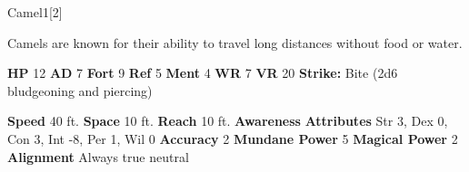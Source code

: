   \begin{monsection}{Camel}{1}[2]
    \vspace{-1em}\vspace{-1em}
    \vspace{0em}

    
        Camels are known for their ability to travel long distances without food or water.
      

    \begin{spellcontent}
      \begin{spelltargetinginfo}
        \pari \textbf{HP} 12 \monsep
          \textbf{AD} 7 \monsep
          \textbf{Fort} 9 \monsep
          \textbf{Ref} 5 \monsep
          \textbf{Ment} 4
        \pari \textbf{WR} 7 \monsep
        \textbf{VR} 20
        \pari \textbf{Strike:}
            Bite  (2d6 bludgeoning and piercing)
      \end{spelltargetinginfo}
    \end{spellcontent}
    \begin{monsterfooter}
      \pari \textbf{Speed} 40 ft. \monsep
        \textbf{Space} 10 ft. \monsep
        \textbf{Reach} 10 ft.
      \pari \textbf{Awareness} 
      \pari \textbf{Attributes}
        Str 3, Dex 0,
        Con 3, Int -8,
        Per 1, Wil 0
      \pari \textbf{Accuracy} 2 \monsep
        \textbf{Mundane Power} 5 \monsep
      \textbf{Magical Power} 2
      \pari \textbf{Alignment} Always true neutral
    \end{monsterfooter}
  \end{monsection}
  
